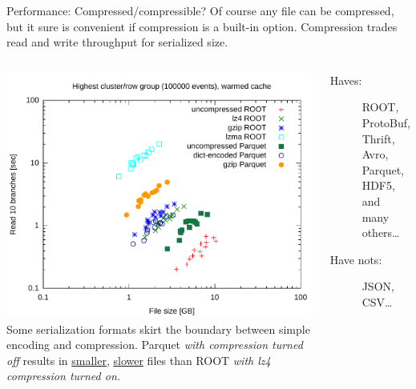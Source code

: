\documentclass[aspectratio=169]{beamer}
\begin{document}
\begin{frame}{Performance: Compressed/compressible?}
\vspace{0.35 cm}
Of course any file can be compressed, but it sure is convenient if compression is a built-in option. Compression trades read and write throughput for serialized size.

\begin{columns}
\includegraphics[width=\linewidth]{root-parquet-size-throughput.pdf}
\small
Some serialization formats skirt the boundary between simple encoding and compression. Parquet {\it with compression turned off} results in \underline{smaller}, \underline{slower} files than ROOT {\it with lz4 compression turned on.}

\vspace{0.25 cm}
\normalsize
\begin{description}
\item[Haves:] ROOT, ProtoBuf, Thrift, Avro, Parquet, HDF5, and many others\ldots
\item[Have nots:] JSON, CSV\ldots
\end{description}
\end{columns}
\end{frame}
\end{document}
